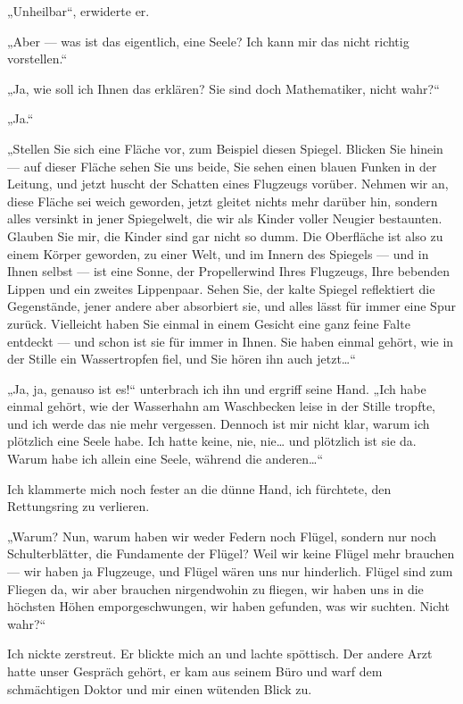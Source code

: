 „Unheilbar“, erwiderte er.

„Aber — was ist das eigentlich, eine Seele? Ich kann mir das nicht
richtig vorstellen.“

„Ja, wie soll ich Ihnen das erklären? Sie sind doch Mathematiker,
nicht wahr?“

„Ja.“

„Stellen Sie sich eine Fläche vor, zum Beispiel diesen Spiegel.
Blicken Sie hinein — auf dieser Fläche sehen Sie uns beide, Sie
sehen einen blauen Funken in der Leitung, und jetzt huscht der
Schatten eines Flugzeugs vorüber. Nehmen wir an, diese Fläche sei
weich geworden, jetzt gleitet nichts mehr darüber hin, sondern
alles versinkt in jener Spiegelwelt, die wir als Kinder voller
Neugier bestaunten. Glauben Sie mir, die Kinder sind gar nicht so
dumm. Die Oberfläche ist also zu einem Körper geworden, zu einer
Welt, und im Innern des Spiegels — und in Ihnen selbst — ist eine
Sonne, der Propellerwind Ihres Flugzeugs, Ihre bebenden Lippen und
ein zweites Lippenpaar. Sehen Sie, der kalte Spiegel reflektiert
die Gegenstände, jener andere aber absorbiert sie, und alles lässt
für immer eine Spur zurück. Vielleicht haben Sie einmal in einem
Gesicht eine ganz feine Falte entdeckt — und schon ist sie für
immer in Ihnen. Sie haben einmal gehört, wie in der Stille ein
Wassertropfen fiel, und Sie hören ihn auch jetzt\ldots{}“

„Ja, ja, genauso ist es!“ unterbrach ich ihn und ergriff seine
Hand. „Ich habe einmal gehört, wie der Wasserhahn am Waschbecken
leise in der Stille tropfte, und ich werde das nie mehr vergessen.
Dennoch ist mir nicht klar, warum ich plötzlich eine Seele habe.
Ich hatte keine, nie, nie\ldots{} und plötzlich ist sie da. Warum habe
ich allein eine Seele, während die anderen\ldots{}“

Ich klammerte mich noch fester an die dünne Hand, ich fürchtete,
den Rettungsring zu verlieren.

„Warum? Nun, warum haben wir weder
Federn noch Flügel, sondern nur noch Schulterblätter, die
Fundamente
der Flügel? Weil wir keine Flügel mehr brauchen — wir haben ja
Flugzeuge, und Flügel wären uns nur hinderlich. Flügel sind zum
Fliegen da, wir aber brauchen nirgendwohin zu fliegen, wir haben
uns in die höchsten Höhen emporgeschwungen, wir haben gefunden, was
wir suchten. Nicht wahr?“

Ich nickte zerstreut. Er blickte mich an und lachte spöttisch. Der
andere Arzt hatte unser Gespräch gehört, er kam aus seinem Büro und
warf dem schmächtigen Doktor und mir einen wütenden Blick zu.

